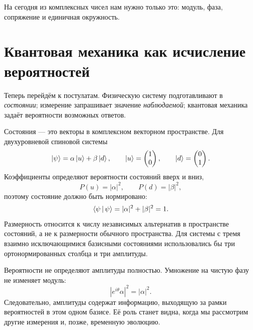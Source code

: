 \begin{classroomqa}
\end{classroomqa}

На сегодня из комплексных чисел нам нужно только это: модуль, фаза, сопряжение и единичная окружность.

\section{Квантовая механика как исчисление вероятностей}

Теперь перейдём к постулатам. Физическую систему подготавливают в \emph{состоянии}; измерение запрашивает значение \emph{наблюдаемой}; квантовая механика задаёт вероятности возможных ответов.

Состояния — это векторы в комплексном векторном пространстве. Для двухуровневой спиновой системы
\begin{equation}
  \left\lvert\psi\right\rangle=\alpha\left\lvert u\right\rangle+\beta\left\lvert d\right\rangle,
  \qquad
  \left\lvert u\right\rangle=\begin{pmatrix}1\\0\end{pmatrix},
  \qquad
  \left\lvert d\right\rangle=\begin{pmatrix}0\\1\end{pmatrix}.
  \label{eq:l03-two-level-state}
\end{equation}
Коэффициенты определяют вероятности состояний вверх и вниз,
\begin{equation}
  P(u)=|\alpha|^2,
  \qquad
  P(d)=|\beta|^2,
\end{equation}
поэтому состояние должно быть нормировано:
\begin{equation}
  \left\langle\psi\,\middle|\,\psi\right\rangle
  =|\alpha|^2+|\beta|^2
  =1.
  \label{eq:l03-state-normalization}
\end{equation}
Размерность относится к числу независимых альтернатив в пространстве состояний, а не к размерности обычного пространства. Для системы с тремя взаимно исключающимися базисными состояниями использовались бы три ортонормированных столбца и три амплитуды.

Вероятности не определяют амплитуды полностью. Умножение на чистую фазу не изменяет модуль:
\begin{equation}
  |e^{i\theta}\alpha|^2=|\alpha|^2.
\end{equation}
Следовательно, амплитуды содержат информацию, выходящую за рамки вероятностей в этом одном базисе. Её роль станет видна, когда мы рассмотрим другие измерения и, позже, временную эволюцию.

